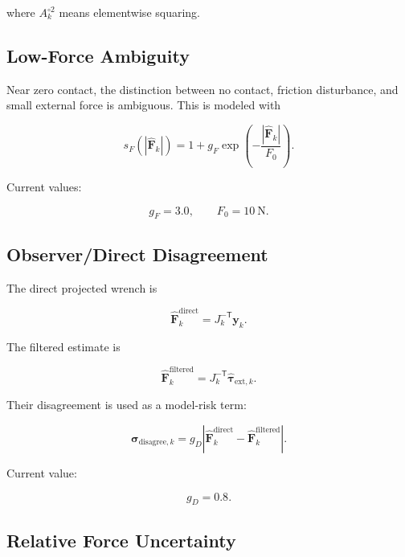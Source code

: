 \documentclass[11pt]{article}
\newcommand{\Fhat}{\hat{\bm F}}
\begin{document}
where \(A_k^{\circ 2}\) means elementwise squaring.

\subsection{Low-Force Ambiguity}

Near zero contact, the distinction between no contact, friction disturbance,
and small external force is ambiguous. This is modeled with

\begin{equation}
s_F(|\Fhat_k|)
= 1 + g_F \exp\left(-\frac{|\Fhat_k|}{F_0}\right).
\end{equation}

Current values:

\begin{equation}
g_F = 3.0,
\qquad
F_0 = 10~\mathrm{N}.
\end{equation}

\subsection{Observer/Direct Disagreement}

The direct projected wrench is

\begin{equation}
\Fhat^{\mathrm{direct}}_k
= J_k^{-\mathsf{T}}\bm y_k.
\end{equation}

The filtered estimate is

\begin{equation}
\Fhat^{\mathrm{filtered}}_k
= J_k^{-\mathsf{T}}\hat{\bm \tau}_{\mathrm{ext},k}.
\end{equation}

Their disagreement is used as a model-risk term:

\begin{equation}
\bm \sigma_{\mathrm{disagree},k}
= g_D
\left|
\Fhat^{\mathrm{direct}}_k
- \Fhat^{\mathrm{filtered}}_k
\right|.
\end{equation}

Current value:

\begin{equation}
g_D = 0.8.
\end{equation}

\subsection{Relative Force Uncertainty}
\end{document}

